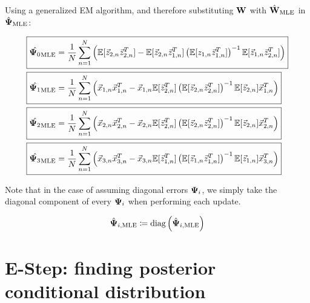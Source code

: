 \begin{landscape}
Using a generalized EM algorithm, and therefore substituting $\bold{W}$ with
$\hat{\bold{W}}_{\text{MLE}}$ in $\hat{\bold{\Psi}}_{\text{MLE}}$:

\begin{align*}
\Aboxed{ \hat{\bpsi_0}_{\text{MLE}} &=  \frac{1}{N}  \sum_{n=1}^N \left( \ev[\z_{2,n} \z_{2,n}^T] -  \ev [\z_{2,n} \z_{1,n}^T]
                             \left( \ev [z_{1,n} \z_{1,n}^T ] \right)^{-1} \ev[
                                      \z_{1,n} \z_{2,n}^T] \right) }\\
\Aboxed{   \hat{\bpsi_1}_{\text{MLE}} &=\frac{1}{N}  \sum_{n=1}^N  \left( \x_{1,n} \x_{1,n}^T - \x_{1,n} \ev[\z_{2,n}^T]
                                        \left( \ev [\z_{2,n} \z_{2,n}^T
                                        ]\right)^{-1} \ev[\z_{2,n}]
                               \x_{1,n}^T \right)}\\
  \Aboxed{   \hat{\bpsi_2}_{\text{MLE}} &= \frac{1}{N}  \sum_{n=1}^N  \left( \x_{2,n} \x_{2,n}^T - \x_{2,n} \ev[\z_{2,n}^T]
                                        \left( \ev [\z_{2,n} \z_{2,n}^T
                                        ]\right)^{-1} \ev[\z_{2,n}]
                                 \x_{2,n}^T \right)}\\
    \Aboxed{   \hat{\bpsi_3}_{\text{MLE}} &= \frac{1}{N}  \sum_{n=1}^N
                                            \left( \x_{3,n} \x_{3,n}^T - \x_{3,n} \ev[\z_{1,n}^T]
                                        \left( \ev [\z_{1,n} \z_{1,n}^T
                                        ]\right)^{-1} \ev[\z_{1,n}] \x_{3,n}^T
                                            \right)}\\
\end{align*}

Note that in the case of assuming diagonal errors $\bold{\Psi}_i$, we simply
take the diagonal component of every $\bold{\Psi}_i$ when performing each
update. 

\begin{align}
  \hat{\bold{\Psi}}_{i, \text{MLE}} \coloneqq \text{diag}
  \left(\hat{\bold{\Psi}}_{i, \text{MLE}} \right)
\end{align}
\pagebreak
\section{E-Step: finding posterior conditional distribution}



\end{landscape}
